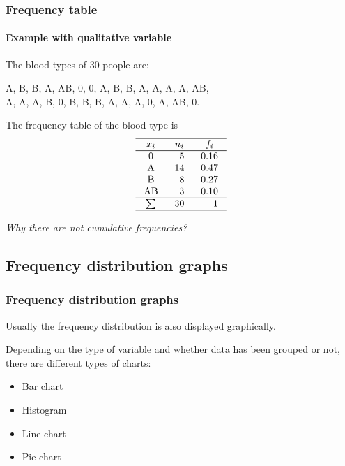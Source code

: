 \begin{frame}
\frametitle{Frequency table}
\framesubtitle{Example with qualitative variable}
The blood types of 30 people are:
\begin{center}
A, B, B, A, AB, 0, 0, A, B, B, A, A, A, A, AB,\\
A, A, A, B, 0, B, B, B, A, A, A, 0, A, AB, 0.
\end{center}
The frequency table of the blood type is 
\[
\setlength\arraycolsep{3mm}
\setlength\arrayrulewidth{0.5pt}
\begin{array}{crr}
\hline
\multicolumn{1}{c}{x_i} & \multicolumn{1}{c}{n_i} & \multicolumn{1}{c}{f_i} \\
\hline
\mbox{0} & 5 & 0.16 \\
\mbox{A} & 14 & 0.47 \\
\mbox{B} & 8 & 0.27 \\
\mbox{AB} & 3 & 0.10 \\
\hline
\sum & 30 & 1 \\
\hline
\end{array}
\]
\begin{center}
\emph{Why there are not cumulative frequencies?}
\end{center} 
\end{frame}


\subsection{Frequency distribution graphs}

\begin{frame}
\frametitle{Frequency distribution graphs}
Usually the frequency distribution is also displayed graphically.
 
Depending on the type of variable and whether data has been grouped or not, there are different types of charts:
\begin{itemize}
\item Bar chart
\item Histogram
\item Line chart
\item Pie chart
\end{itemize}
\end{frame} 


